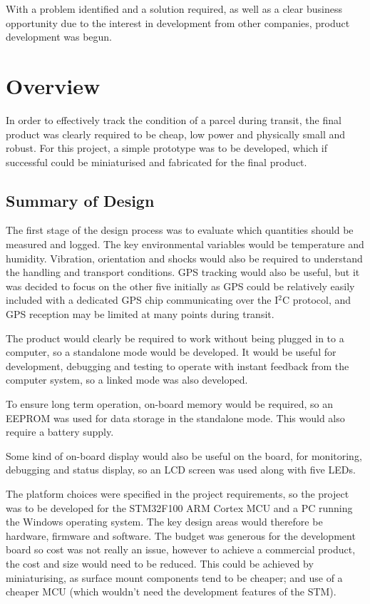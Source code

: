\documentclass[a4paper,10pt]{article}  %
\begin{document}
With a problem identified and a solution required, as well as a clear
business opportunity due to the interest in development from other
companies, product development was begun.

\section{Overview}
\label{sec:overview}

In order to effectively track the condition of a parcel during
transit, the final product was clearly required to be cheap, low power
and physically small and robust. For this project, a simple prototype
was to be developed, which if successful could be miniaturised and
fabricated for the final product.

\subsection{Summary of Design}
\label{sec:summary-design}

The first stage of the design process was to evaluate which quantities
should be measured and logged. The key environmental variables would
be temperature and humidity. Vibration, orientation and shocks would
also be required to understand the handling and transport
conditions. GPS tracking would also be useful, but it was decided to
focus on the other five initially as GPS could be relatively easily
included with a dedicated GPS chip communicating over the I$^2$C
protocol, and GPS reception may be limited at many points during
transit.

The product would clearly be required to work without being plugged in
to a computer, so a standalone mode would be developed. It would be
useful for development, debugging and testing to operate with instant
feedback from the computer system, so a linked mode was also
developed.

To ensure long term operation, on-board memory would be required, so an
EEPROM was used for data storage in the standalone mode. This would
also require a battery supply.

Some kind of on-board display would also be useful on the board, for
monitoring, debugging and status display, so an LCD screen was used
along with five LEDs.

The platform choices were specified in the project requirements, so
the project was to be developed for the STM32F100 ARM Cortex MCU and a
PC running the Windows operating system. The key design areas would
therefore be hardware, firmware and software. The budget was generous
for the development board so cost was not really an issue, however to
achieve a commercial product, the cost and size would need to be
reduced. This could be achieved by miniaturising, as surface mount
components tend to be cheaper; and use of a cheaper MCU (which wouldn't
need the development features of the STM).
\end{document}
